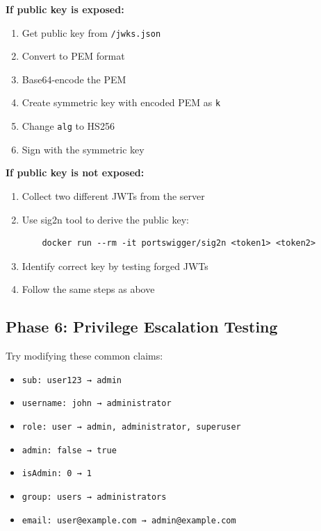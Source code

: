 \documentclass{article}
\begin{document}
\begin{methodologybox}[RS256 → HS256 Conversion]
\textbf{If public key is exposed:}
\begin{enumerate}
    \item Get public key from \texttt{/jwks.json}
    \item Convert to PEM format
    \item Base64-encode the PEM
    \item Create symmetric key with encoded PEM as \texttt{k}
    \item Change \texttt{alg} to HS256
    \item Sign with the symmetric key
\end{enumerate}

\textbf{If public key is not exposed:}
\begin{enumerate}
    \item Collect two different JWTs from the server
    \item Use sig2n tool to derive the public key:
    \begin{verbatim}
    docker run --rm -it portswigger/sig2n <token1> <token2>
    \end{verbatim}
    \item Identify correct key by testing forged JWTs
    \item Follow the same steps as above
\end{enumerate}
\end{methodologybox}

\subsection{Phase 6: Privilege Escalation Testing}

\begin{methodologybox}
Try modifying these common claims:
\begin{itemize}
    \item \texttt{sub: user123 → admin}
    \item \texttt{username: john → administrator}
    \item \texttt{role: user → admin, administrator, superuser}
    \item \texttt{admin: false → true}
    \item \texttt{isAdmin: 0 → 1}
    \item \texttt{group: users → administrators}
    \item \texttt{email: user@example.com → admin@example.com}
\end{itemize}
\end{methodologybox}
\end{document}

